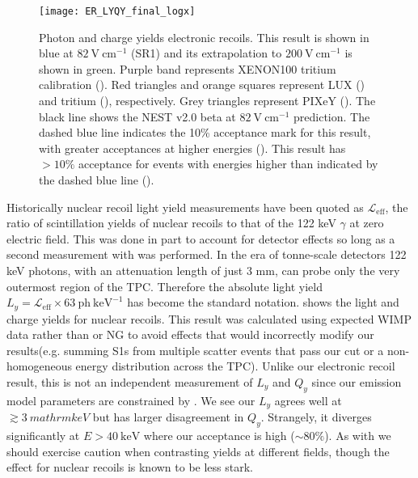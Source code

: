 \begin{figure}
\centering
\texttt{[image: ER\_LYQY\_final\_logx]}
\caption{Photon and charge yields electronic recoils.  This result is shown in blue at $82\ \mathrm{V\ cm^{-1}}$ (SR1) and its
extrapolation to $200\ \mathrm{V\ cm^{-1}}$ is shown in green.  Purple band represents XENON100 tritium calibration
().  Red triangles and orange squares represent
LUX  () and tritium (), respectively.  Grey triangles represent PIXeY 
().  The black line shows the NEST v2.0 beta at $82\ \mathrm{V\ cm^{-1}}$ prediction.  The dashed blue line indicates
the 10\% acceptance mark for this result, with greater acceptances at higher
energies ().  This result has $> 10\%$ acceptance for events with energies higher than
indicated by the dashed blue line ().}
\label{fig:er_nr_calibrations_results_ly_qy_er}
\end{figure}

Historically nuclear recoil light yield measurements have been quoted as
$\mathcal{L}_{\mathrm{eff}}$, the ratio of scintillation yields of nuclear recoils to that of the  122 keV $\gamma$ at zero
electric field.  This was done in part to account for detector effects so long as a second measurement with  was
performed.  In the era of tonne-scale detectors 122 keV photons, with an attenuation length of just 3 mm, can probe only the very
outermost region of the TPC.  Therefore the absolute light yield $L_y = \mathcal{L}_{\mathrm{eff}} \times 63\ \mathrm{ph\ keV^{-1}}$ has
become the standard notation.   shows the light and charge yields for nuclear
recoils.  This result was calculated using expected WIMP data rather than \ambe or NG to avoid effects that would incorrectly modify
our results(e.g. summing S1s from multiple scatter events that pass our cut or a non-homogeneous energy distribution across the
TPC).  Unlike our electronic recoil result, this is not an independent measurement of $L_y$ and $Q_y$ since our emission model parameters
are constrained by .  We
see our $L_y$ agrees well at $\gtrsim 3\ mathrm{keV}$ but has larger disagreement in $Q_y$.  Strangely, it diverges significantly at
$E > 40\ \mathrm{keV}$ where our acceptance is high (${\sim} 80\%$).  As with  we should
exercise caution when contrasting yields at different fields, though the effect for nuclear recoils is known to be less stark.

